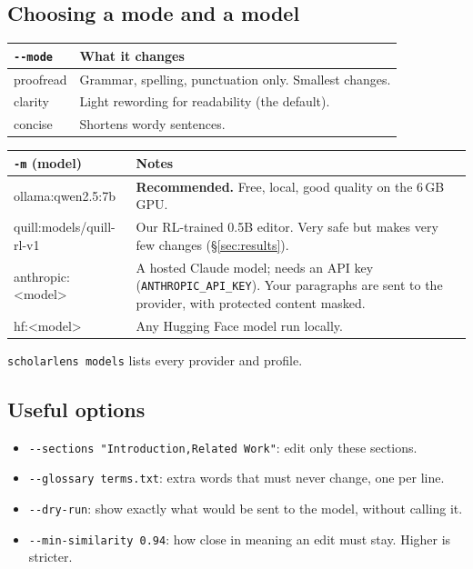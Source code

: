 \documentclass[11pt]{article}
\newcommand{\cm}[1]{\texttt{#1}}
\begin{document}
\subsection*{Choosing a mode and a model}
\begin{tabularx}{\linewidth}{@{}>{\ttfamily}l X@{}}
\toprule
\normalfont \texttt{-{}-mode} & What it changes \\
\midrule
proofread & Grammar, spelling, punctuation only. Smallest changes. \\
clarity & Light rewording for readability (the default). \\
concise & Shortens wordy sentences. \\
\bottomrule
\end{tabularx}

\begin{tabularx}{\linewidth}{@{}>{\ttfamily}l X@{}}
\toprule
\normalfont \texttt{-m} (model) & Notes \\
\midrule
ollama:qwen2.5:7b & \textbf{Recommended.} Free, local, good quality on the 6\,GB GPU. \\
quill:models/quill-rl-v1 & Our RL-trained 0.5B editor. Very safe but makes very few changes (\S\ref{sec:results}). \\
anthropic:<model> & A hosted Claude model; needs an API key (\cm{ANTHROPIC\_API\_KEY}). Your paragraphs are sent to the provider, with protected content masked. \\
hf:<model> & Any Hugging Face model run locally. \\
\bottomrule
\end{tabularx}
\smallskip
\cm{scholarlens models} lists every provider and profile.

\subsection*{Useful options}
\begin{itemize}
  \item \cm{-{}-sections "Introduction,Related Work"}: edit only these sections.
  \item \cm{-{}-glossary terms.txt}: extra words that must never change, one per line.
  \item \cm{-{}-dry-run}: show exactly what would be sent to the model, without calling it.
  \item \cm{-{}-min-similarity 0.94}: how close in meaning an edit must stay. Higher is stricter.
\end{itemize}
\end{document}
